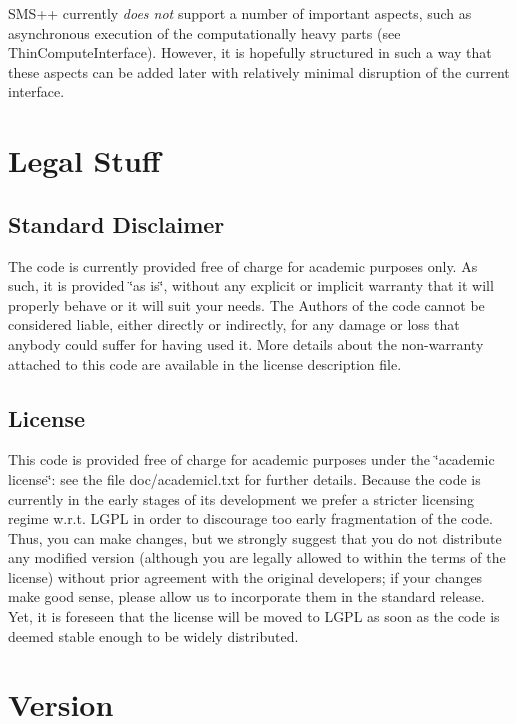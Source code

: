 S\+M\+S++ currently {\itshape does not} support a number of important aspects, such as asynchronous execution of the computationally heavy parts (see Thin\+Compute\+Interface). However, it is hopefully structured in such a way that these aspects can be added later with relatively minimal disruption of the current interface.

\section*{Legal Stuff }

\subsection*{Standard Disclaimer }

The code is currently provided free of charge for academic purposes only. As such, it is provided \char`\"{}as is\char`\"{}, without any explicit or implicit warranty that it will properly behave or it will suit your needs. The Authors of the code cannot be considered liable, either directly or indirectly, for any damage or loss that anybody could suffer for having used it. More details about the non-\/warranty attached to this code are available in the license description file.

\subsection*{License }

This code is provided free of charge for academic purposes under the \char`\"{}academic license\char`\"{}\+: see the file doc/academicl.\+txt for further details. Because the code is currently in the early stages of its development we prefer a stricter licensing regime w.\+r.\+t. L\+G\+PL in order to discourage too early fragmentation of the code. Thus, you can make changes, but we strongly suggest that you do not distribute any modified version (although you are legally allowed to within the terms of the license) without prior agreement with the original developers; if your changes make good sense, please allow us to incorporate them in the standard release. Yet, it is foreseen that the license will be moved to L\+G\+PL as soon as the code is deemed stable enough to be widely distributed.

\section*{Version }


